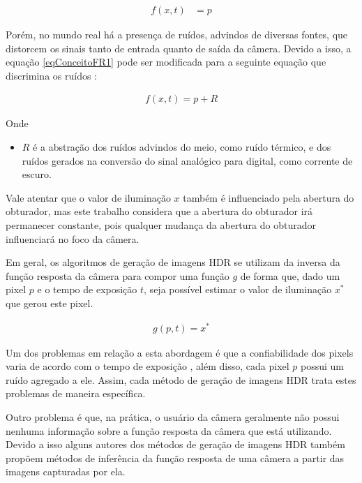 	
\begin{align} \label{eqConceitoFR1}
          f(x,t) &= p
\end{align}

	Porém, no mundo real há a presença de ruídos, advindos de diversas fontes, que distorcem os sinais tanto de entrada quanto de saída da câmera. Devido a isso, a equação \ref{eqConceitoFR1} pode ser modificada para a seguinte equação que discrimina os ruídos \cite{bestHDRs}:

\begin{align} \label{eqConceitoFR2}
						f (x, t) = p + R
\end{align}

Onde
\begin{itemize}
	\item $R$ é a abstração dos ruídos advindos do meio, como ruído térmico, e dos ruídos gerados na conversão do sinal analógico para digital, como corrente de escuro.
\end{itemize} 
		
	Vale atentar que o valor de iluminação $x$ também é influenciado pela abertura do obturador, mas este trabalho considera que a abertura do obturador irá permanecer constante, pois qualquer mudança da abertura do obturador influenciará no foco da câmera. 
	
	Em geral, os algoritmos de geração de imagens HDR se utilizam da inversa da função resposta da câmera para compor uma função $g$ de forma que, dado um pixel $p$ e o tempo de exposição $t$, seja possível estimar o valor de iluminação $x^*$ que gerou este pixel.

\begin{align} \label{eqConceitoFR3}
	g(p, t) = x^*
\end{align}
	
	Um dos problemas em relação a esta abordagem é que a confiabilidade dos pixels varia de acordo com o tempo de exposição \cite{robertson}, além disso, cada pixel $p$ possui um ruído agregado a ele. Assim, cada método de geração de imagens HDR trata estes problemas de maneira específica.
	
	Outro problema é que, na prática, o usuário da câmera geralmente não possui nenhuma informação sobre a função resposta da câmera que está utilizando. Devido a isso alguns autores dos métodos de geração de imagens HDR também propõem métodos de inferência da função resposta de uma câmera a partir das imagens capturadas por ela.

